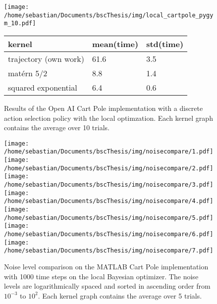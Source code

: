 \begin{figure}
\centering
\begin{minipage}{.6\textwidth}
  \centering
  \texttt{[image: /home/sebastian/Documents/bscThesis/img/local\_cartpole\_pygym\_10.pdf]}
\end{minipage}%
\begin{minipage}{.4\linewidth}
  \centering
  \begin{tabularx}{\linewidth}{|X|l|l|}
      \hline
      kernel & mean(time) & std(time)\\\hline
      trajectory (own work) & 61.6 & 3.5\\\hline
      matérn 5/2 & 8.8 & 1.4\\\hline
      squared exponential & 6.4 & 0.6\\\hline
  \end{tabularx}
\end{minipage}
\caption{Results of the Open AI Cart Pole implementation with a discrete action selection policy with the local optimzation. Each kernel graph contains the average over 10 trials.}
\label{fig:cartpolePygym}
\end{figure}



\begin{figure}[h]
\centering
\texttt{[image: /home/sebastian/Documents/bscThesis/img/noisecompare/1.pdf]}
\texttt{[image: /home/sebastian/Documents/bscThesis/img/noisecompare/2.pdf]}
\texttt{[image: /home/sebastian/Documents/bscThesis/img/noisecompare/3.pdf]}
\texttt{[image: /home/sebastian/Documents/bscThesis/img/noisecompare/4.pdf]}
\texttt{[image: /home/sebastian/Documents/bscThesis/img/noisecompare/5.pdf]}
\texttt{[image: /home/sebastian/Documents/bscThesis/img/noisecompare/6.pdf]}
\texttt{[image: /home/sebastian/Documents/bscThesis/img/noisecompare/7.pdf]}

\caption{Noise level comparison on the MATLAB Cart Pole implementation with 1000 time steps on the local Bayesian optimizer. The noise levels are logarithmically spaced and sorted in ascending order from $10^{-3}$ to $10^2$. Each kernel graph contains the average over 5 trials.}
\label{fig:noisecompare}
\end{figure}
